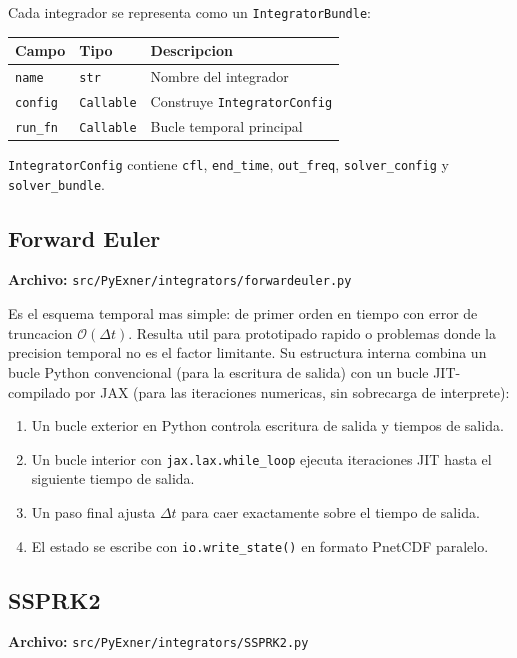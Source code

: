\documentclass[11pt,a4paper]{article}
\newcommand{\code}[1]{\texttt{#1}}
\begin{document}
Cada integrador se representa como un \code{IntegratorBundle}:

\begin{tabularx}{\textwidth}{L{3cm}L{3cm}Y}
\toprule
Campo & Tipo & Descripcion \\
\midrule
\code{name} & \code{str} & Nombre del integrador \\
\code{config} & \code{Callable} & Construye \code{IntegratorConfig} \\
\code{run\_fn} & \code{Callable} & Bucle temporal principal \\
\bottomrule
\end{tabularx}

\code{IntegratorConfig} contiene \code{cfl}, \code{end\_time}, \code{out\_freq},
\code{solver\_config} y \code{solver\_bundle}.

\subsection{Forward Euler}

\textbf{Archivo:} \code{src/PyExner/integrators/forwardeuler.py}

Es el esquema temporal mas simple: de primer orden en tiempo con error de truncacion
$\mathcal{O}(\Delta t)$. Resulta util para prototipado rapido o problemas donde la precision
temporal no es el factor limitante. Su estructura interna combina un bucle Python convencional
(para la escritura de salida) con un bucle JIT-compilado por JAX (para las iteraciones
numericas, sin sobrecarga de interprete):

\begin{enumerate}[leftmargin=1.8em]
  \item Un bucle exterior en Python controla escritura de salida y tiempos de salida.
  \item Un bucle interior con \code{jax.lax.while\_loop} ejecuta iteraciones JIT hasta el siguiente tiempo de salida.
  \item Un paso final ajusta $\Delta t$ para caer exactamente sobre el tiempo de salida.
  \item El estado se escribe con \code{io.write\_state()} en formato PnetCDF paralelo.
\end{enumerate}

\subsection{SSPRK2}

\textbf{Archivo:} \code{src/PyExner/integrators/SSPRK2.py}
\end{document}
